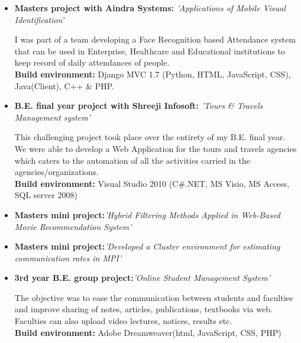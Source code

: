 \documentclass[11pt,a4paper,sans]{moderncv}        %
\begin{document}
\begin{itemize}

\item{\textbf{Masters project with Aindra Systems:} \textit{'Applications of Mobile Visual Identification'}

\vspace{3pt}

\small{I was part of a team developing a Face Recognition based Attendance system that can be used in Enterprise, Healthcare and Educational institutions to keep record of daily attendances of people.}
\\ \textbf{ Build environment:} Django MVC 1.7 (Python, HTML, JavaScript, CSS), Java(Client), C++ \& PHP.
}

\vspace{8pt}

\item{\textbf{B.E. final year project with Shreeji Infosoft:} \textit{'Tours \& Travels Management system'}

\vspace{3pt}

\small{This challenging project took place over the entirety of my B.E. final year. We were able to develop a Web Application for the tours and travels agencies which caters to the automation of all the activities carried in the agencies/organizations.}
\\ \textbf{ Build environment:} Visual Studio 2010 (C\#.NET, MS Visio, MS Access, SQL server 2008)
}

\vspace{8pt}

\item{\textbf{Masters mini project:}\textit{'Hybrid Filtering Methods Applied in Web-Based Movie Recommendation System'}}

\vspace{8pt}

\item{\textbf{Masters mini project:}\textit{'Developed a Cluster environment for estimating communication rates in MPI'}}



\vspace{8pt}

\item{\textbf{3rd year B.E. group project:}\textit{'Online Student Management System'}

\vspace{3pt}

\small{The objective was to ease the communication between students and faculties and improve sharing of notes, articles, publications, textbooks via web. Faculties can also upload video lectures, notices, results etc.}
\\ \textbf{Build environment:} Adobe Dreamweaver(html, JavaScript, CSS, PHP)
}

\end{itemize}
\end{document}
